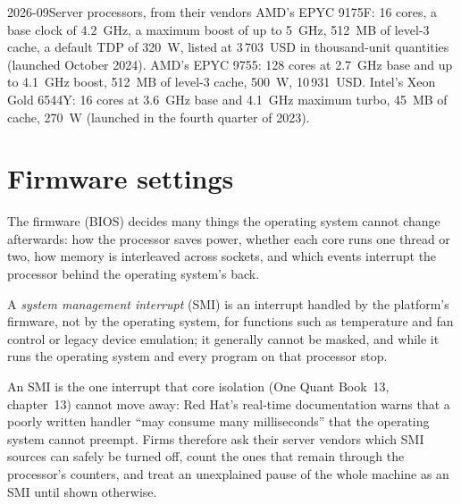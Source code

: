 \begin{dated}{2026-09}{Server processors, from their vendors}\label{dat:nw:servers:parts}
AMD's EPYC 9175F: 16 cores, a base clock of 4.2~GHz, a maximum boost of up to 5~GHz, 512~MB of level-3 cache, a default TDP of
\qty{320}{\watt}, listed at 3\,703~USD in thousand-unit quantities (launched October 2024). AMD's EPYC 9755: 128 cores at 2.7~GHz base
and up to 4.1~GHz boost, 512~MB of level-3 cache, \qty{500}{\watt}, 10\,931~USD. Intel's Xeon Gold 6544Y: 16 cores at 3.6~GHz base and
4.1~GHz maximum turbo, 45~MB of cache, \qty{270}{\watt} (launched in the fourth quarter of 2023).
\end{dated}

\section{Firmware settings}

The firmware (BIOS) decides many things the operating system cannot change afterwards: how the processor saves power, whether each
core runs one thread or two, how memory is interleaved across sockets, and which events interrupt the processor behind the operating
system's back.

\begin{definition}\label{def:nw:servers:smi}
A \emph{system management interrupt} (SMI) is an interrupt handled by the platform's firmware, not
by the operating system, for functions such as temperature and fan control or legacy device emulation; it generally cannot be masked,
and while it runs the operating system and every program on that processor stop.
\end{definition}

An SMI is the one interrupt that core isolation (One Quant Book~13, chapter~13) cannot move away: Red Hat's real-time documentation warns
that a poorly written handler ``may consume many milliseconds'' that the operating system cannot preempt. Firms therefore ask their
server vendors which SMI sources can safely be turned off, count the ones that remain through the processor's counters, and treat an
unexplained pause of the whole machine as an SMI until shown otherwise.

